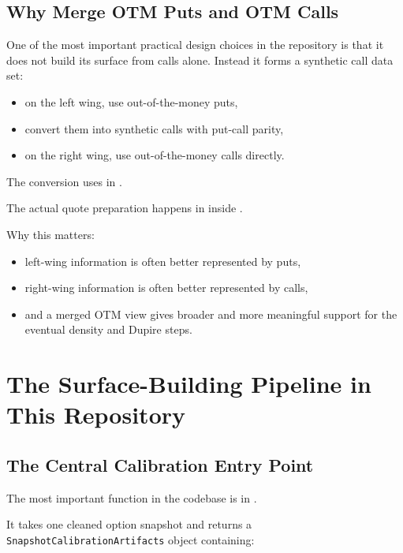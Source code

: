 \documentclass[11pt]{article}
\begin{document}
\subsection{Why Merge OTM Puts and OTM Calls}

One of the most important practical design choices in the repository is that it does not build its surface from calls alone. Instead it forms a synthetic call data set:

\begin{itemize}
  \item on the left wing, use out-of-the-money puts,
  \item convert them into synthetic calls with put-call parity,
  \item on the right wing, use out-of-the-money calls directly.
\end{itemize}

The conversion uses
 in .

The actual quote preparation happens in
 inside
.

Why this matters:

\begin{itemize}
  \item left-wing information is often better represented by puts,
  \item right-wing information is often better represented by calls,
  \item and a merged OTM view gives broader and more meaningful support for the eventual density and Dupire steps.
\end{itemize}

\section{The Surface-Building Pipeline in This Repository}

\subsection{The Central Calibration Entry Point}

The most important function in the codebase is
 in
.

It takes one cleaned option snapshot and returns a
\texttt{SnapshotCalibrationArtifacts} object containing:
\end{document}
